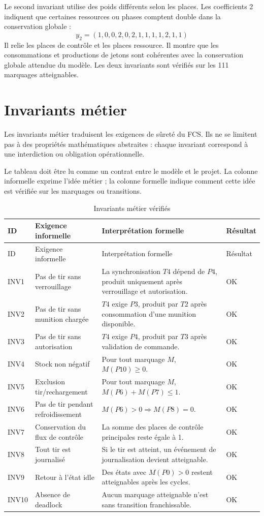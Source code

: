 \documentclass[11pt,a4paper]{report}
\begin{document}
Le second invariant utilise des poids différents selon les places. Les coefficients 2 indiquent que certaines ressources ou phases comptent double dans la conservation globale :
\[
y_2 = (1,0,0,2,0,2,1,1,1,1,2,1,1)
\]
Il relie les places de contrôle et les places ressource. Il montre que les consommations et productions de jetons sont cohérentes avec la conservation globale attendue du modèle. Les deux invariants sont vérifiés sur les 111 marquages atteignables.

\section{Invariants métier}
Les invariants métier traduisent les exigences de sûreté du FCS. Ils ne se limitent pas à des propriétés mathématiques abstraites : chaque invariant correspond à une interdiction ou obligation opérationnelle.

Le tableau doit être lu comme un contrat entre le modèle et le projet. La colonne informelle exprime l'idée métier ; la colonne formelle indique comment cette idée est vérifiée sur les marquages ou transitions.

\begin{longtable}{p{1.2cm}p{4cm}p{6.2cm}p{1.8cm}}
\caption{Invariants métier vérifiés}
\label{tab:business-invariants}\\
\toprule
ID & Exigence informelle & Interprétation formelle & Résultat \\
\midrule
\endfirsthead
\toprule
ID & Exigence informelle & Interprétation formelle & Résultat \\
\midrule
\endhead
INV1 & Pas de tir sans verrouillage & La synchronisation $T4$ dépend de $P4$, produit uniquement après verrouillage et autorisation. & OK \\
INV2 & Pas de tir sans munition chargée & $T4$ exige $P3$, produit par $T2$ après consommation d'une munition disponible. & OK \\
INV3 & Pas de tir sans autorisation & $T4$ exige $P4$, produit par $T3$ après validation de commande. & OK \\
INV4 & Stock non négatif & Pour tout marquage $M$, $M(P10) \geq 0$. & OK \\
INV5 & Exclusion tir/rechargement & Pour tout marquage $M$, $M(P6)+M(P7)\leq 1$. & OK \\
INV6 & Pas de tir pendant refroidissement & $M(P6)>0 \Rightarrow M(P8)=0$. & OK \\
INV7 & Conservation du flux de contrôle & La somme des places de contrôle principales reste égale à 1. & OK \\
INV8 & Tout tir est journalisé & Si le tir est atteint, un événement de journalisation devient atteignable. & OK \\
INV9 & Retour à l'état idle & Des états avec $M(P0)>0$ restent atteignables après les cycles. & OK \\
INV10 & Absence de deadlock & Aucun marquage atteignable n'est sans transition franchissable. & OK \\
\bottomrule
\end{longtable}
\end{document}

